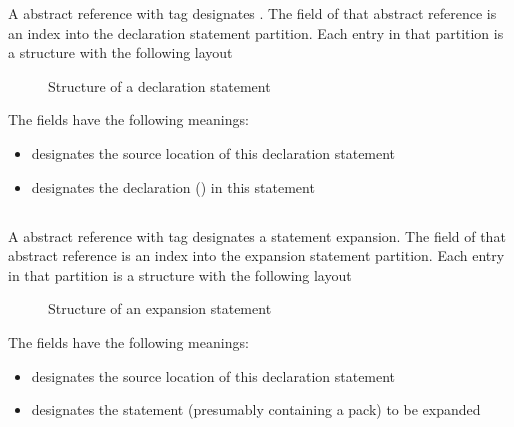 A  abstract reference with tag  designates .
The  field of that abstract reference is an index into the declaration statement partition.
Each entry in that partition is a structure with the following layout
%
\begin{figure}[H]
	\centering
	\caption{Structure of a declaration statement}
	\label{fig:ifc-decl-stmt-structure}
\end{figure}
%
The fields have the following meanings:
\begin{itemize}
	\item {} designates the source location of this declaration statement
	\item {} designates the declaration () in this statement
\end{itemize}


\subsection{}
\label{sec:ifc:StmtSort:Expansion}

A  abstract reference with tag  designates a statement expansion.
The  field of that abstract reference is an index into the expansion statement partition.
Each entry in that partition is a structure with the following layout
%
\begin{figure}[H]
	\centering
	\caption{Structure of an expansion statement}
	\label{fig:ifc-expansion-stmt-structure}
\end{figure}
%
The fields have the following meanings:
\begin{itemize}
	\item {} designates the source location of this declaration statement
	\item {} designates the statement (presumably containing a pack) to be expanded
\end{itemize}


